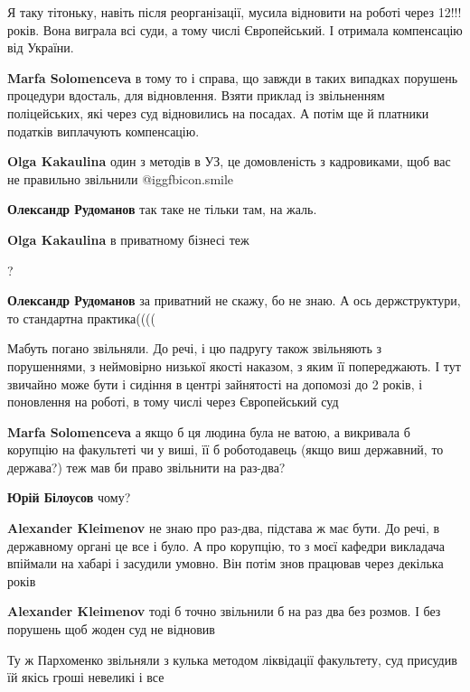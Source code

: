 \begin{itemize}

Я таку тітоньку, навіть після реорганізації, мусила відновити на роботі через
12!!! років. Вона виграла всі суди, а тому числі Європейський. І отримала
компенсацію від України.

\begin{itemize} %
\textbf{Marfa Solomenceva} в тому то і справа, що завжди в таких випадках порушень процедури вдосталь, для відновлення. Взяти приклад із звільненням поліцейських, які через суд відновились на посадах. А потім ще й платники податків виплачують компенсацію.


\textbf{Olga Kakaulina} один з методів в УЗ, це домовленість з кадровиками, щоб вас не правильно звільнили  @igg{fbicon.smile} 

\textbf{Олександр Рудоманов} так таке не тільки там, на жаль.


\textbf{Olga Kakaulina} в приватному бізнесі теж


?

\textbf{Олександр Рудоманов} за приватний не скажу, бо не знаю. А ось держструктури, то стандартна практика((((

Мабуть погано звільняли. До речі, і цю падругу також звільняють з порушеннями, з неймовірно низької якості наказом, з яким її попереджають. І тут звичайно може бути і сидіння в центрі зайнятості на допомозі до 2 років, і поновлення на роботі, в тому числі через Європейський суд

\textbf{Marfa Solomenceva} а якщо б ця людина була не ватою, а викривала б корупцію на факультеті чи у виші, її б роботодавець (якщо виш державний, то держава?) теж мав би право звільнити на раз-два?


\textbf{Юрій Білоусов} чому?

\textbf{Alexander Kleimenov} не знаю про раз-два, підстава ж має бути. До речі, в державному органі це все і було. А про корупцію, то з моєї кафедри викладача впіймали на хабарі і засудили умовно. Він потім знов працював через декілька років

\textbf{Alexander Kleimenov} тоді б точно звільнили б на раз два без розмов. І без порушень щоб жоден суд не відновив

Ту ж Пархоменко звільняли з кулька методом ліквідації факультету, суд присудив їй якісь гроші невеликі і все


\end{itemize}
\end{itemize}
